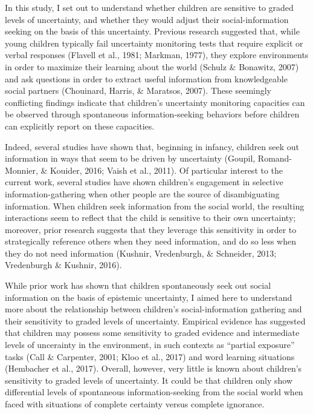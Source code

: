 \documentclass[,man,floatsintext]{apa6}
\begin{document}
In this study, I set out to understand whether children are sensitive to graded levels of uncertainty, and whether they would adjust their social-information seeking on the basis of this uncertainty. Previous research suggested that, while young children typically fail uncertainty monitoring tests that require explicit or verbal responses (Flavell et al., 1981; Markman, 1977), they explore environments in order to maximize their learning about the world (Schulz \& Bonawitz, 2007) and ask questions in order to extract useful information from knowledgeable social partners (Chouinard, Harris, \& Maratsos, 2007). These seemingly conflicting findings indicate that children's uncertainty monitoring capacities can be observed through spontaneous information-seeking behaviors before children can explicitly report on these capacities.

Indeed, several studies have shown that, beginning in infancy, children seek out information in ways that seem to be driven by uncertainty (Goupil, Romand-Monnier, \& Kouider, 2016; Vaish et al., 2011). Of particular interest to the current work, several studies have shown children's engagement in selective information-gathering when other people are the source of disambiguating information. When children seek information from the social world, the resulting interactions seem to reflect that the child is sensitive to their own uncertainty; moreover, prior research suggests that they leverage this sensitivity in order to strategically reference others when they need information, and do so less when they do not need information (Kushnir, Vredenburgh, \& Schneider, 2013; Vredenburgh \& Kushnir, 2016).

While prior work has shown that children spontaneously seek out social information on the basis of epistemic uncertainty, I aimed here to understand more about the relationship between children's social-information gathering and their sensitivity to graded levels of uncertainty. Empirical evidence has suggested that children may possess some sensitivity to graded evidence and intermediate levels of uncerainty in the environment, in such contexts as \enquote{partial exposure} tasks (Call \& Carpenter, 2001; Kloo et al., 2017) and word learning situations (Hembacher et al., 2017). Overall, however, very little is known about children's sensitivity to graded levels of uncertainty. It could be that children only show differential levels of spontaneous information-seeking from the social world when faced with situations of complete certainty versus complete ignorance.
\end{document}
